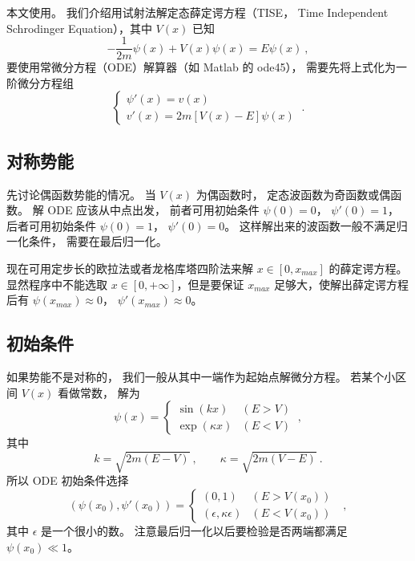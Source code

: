 


本文使用。 我们介绍用试射法解定态薛定谔方程（TISE， Time Independent Schrodinger Equation），其中 $V(x)$ 已知
\begin{equation}
-\frac{1}{2m}\psi(x) + V(x)\psi(x) = E \psi(x)~,
\end{equation}
要使用常微分方程（ODE）解算器（如 Matlab 的 ode45）， 需要先将上式化为一阶微分方程组
\begin{equation}
\begin{cases}
\psi'(x) = v(x)\\
v'(x) = 2m[V(x) - E]\psi(x)
\end{cases}~.
\end{equation}

\subsection{对称势能}
先讨论偶函数势能的情况。 当 $V(x)$ 为偶函数时， 定态波函数为奇函数或偶函数。 解 ODE 应该从中点出发， 前者可用初始条件 $\psi(0)=0$， $\psi'(0)=1$， 后者可用初始条件 $\psi(0)=1$， $\psi'(0)=0$。 这样解出来的波函数一般不满足归一化条件， 需要在最后归一化。

现在可用定步长的欧拉法或者龙格库塔四阶法来解 $x\in [0, x_{max}]$ 的薛定谔方程。 显然程序中不能选取 $x\in [0,+\infty]$，但是要保证 $x_{max}$ 足够大，使解出薛定谔方程后有 $\psi(x_{max})\approx 0$， $\psi'(x_{max})\approx 0$。

\subsection{初始条件}
如果势能不是对称的， 我们一般从其中一端作为起始点解微分方程。 若某个小区间 $V(x)$ 看做常数， 解为
\begin{equation}
\psi(x) =
\begin{cases}
\sin(kx) &(E > V)\\
\exp(\kappa x) & (E < V)
\end{cases}~,
\end{equation}
其中
\begin{equation}
k = \sqrt{2m(E - V)}~, \qquad
\kappa = \sqrt{2m(V - E)}~.
\end{equation}
所以 ODE  初始条件选择
\begin{equation}
(\psi(x_0), \psi'(x_0)) =
\begin{cases}
(0, 1) &(E > V(x_0))\\
(\epsilon, \kappa\epsilon) & (E < V(x_0))
\end{cases}~~~,
\end{equation}
其中 $\epsilon$ 是一个很小的数。 注意最后归一化以后要检验是否两端都满足 $\psi(x_0) \ll 1$。


